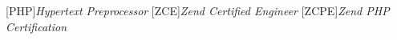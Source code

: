 
[PHP]{\textit{Hypertext Preprocessor}}
[ZCE]{\textit{Zend Certified Engineer}}
[ZCPE]{\textit{Zend PHP Certification}}